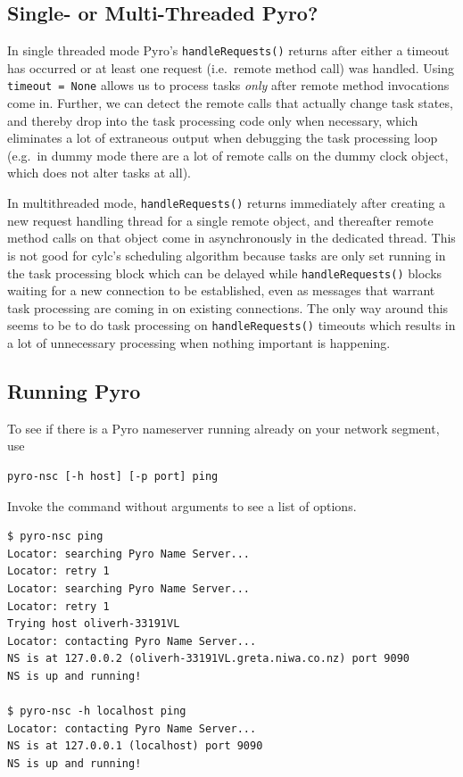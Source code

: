 \documentclass[11pt,a4paper]{article}
\begin{document}
\subsection{Single- or Multi-Threaded Pyro?}
\label{Single-orMulti-ThreadedPyro?}

In single threaded mode Pyro's \lstinline=handleRequests()= returns
after either a timeout has occurred or at least one request
(i.e.\ remote method call) was handled. Using \lstinline|timeout = None| 
allows us to process tasks {\em only} after remote method invocations
come in.  Further, we can detect the remote calls that actually change
task states, and thereby drop into the task processing code only when
necessary, which eliminates a lot of extraneous output when debugging
the task processing loop (e.g.\ in dummy mode there are a lot of remote
calls on the dummy clock object, which does not alter tasks at all). 

In multithreaded mode, \lstinline=handleRequests()= returns immediately
after creating a new request handling thread for a single remote object,
and thereafter remote method calls on that object come in asynchronously
in the dedicated thread. This is not good for cylc's scheduling
algorithm because tasks are only set running in the task processing
block which can be delayed while \lstinline=handleRequests()= blocks waiting
for a new connection to be established, even as messages that warrant
task processing are coming in on existing connections. The only way
around this seems to be to do task processing on \lstinline=handleRequests()=
timeouts which results in a lot of unnecessary processing when nothing
important is happening.

\subsection{Running Pyro}
\label{RunningPyro}

To see if there is a Pyro nameserver running already on your network
segment, use 
\begin{lstlisting}
pyro-nsc [-h host] [-p port] ping
\end{lstlisting}
Invoke the command without arguments to see a list of options.

\lstset{language=bash}

\begin{lstlisting}
$ pyro-nsc ping
Locator: searching Pyro Name Server...
Locator: retry 1
Locator: searching Pyro Name Server...
Locator: retry 1
Trying host oliverh-33191VL
Locator: contacting Pyro Name Server...
NS is at 127.0.0.2 (oliverh-33191VL.greta.niwa.co.nz) port 9090
NS is up and running!

$ pyro-nsc -h localhost ping
Locator: contacting Pyro Name Server...
NS is at 127.0.0.1 (localhost) port 9090
NS is up and running!
\end{lstlisting}
\end{document}
